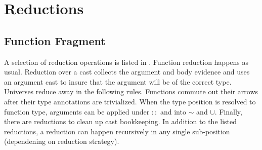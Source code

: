 \section{Reductions}
 
\subsection{Function Fragment}

A selection of reduction operations is listed in .
Function reduction happens as usual.
Reduction over a cast collects the argument and body evidence and uses an argument cast to insure that the argument will be of the correct type.
Universes reduce away in the following rules.
Functions commute out their arrows after their type annotations are trivialized.
When the type position is resolved to function type, arguments can be applied under $::$ and into $\sim$ and $\cup$.
Finally, there are reductions to clean up cast bookkeeping.
In addition to the listed reductions, a reduction can happen recursively in any single sub-position (dependening on reduction strategy).

